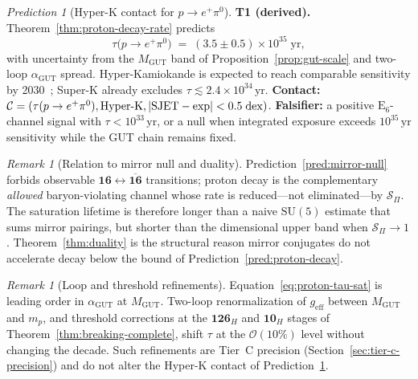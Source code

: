\documentclass[11pt]{article}
\theoremstyle{plain}
\theoremstyle{definition}
\theoremstyle{remark}
\newtheorem{remark}[theorem]{Remark}
\newtheorem{prediction}[theorem]{Prediction}
\numberwithin{equation}{section}
\newcommand{\E}[1]{\mathrm{E}_{#1}}
\begin{document}
\begin{prediction}[Hyper-K contact for $p\to e^+\pi^0$]\label{pred:hyperk}
\textbf{T1 (derived).} Theorem~\ref{thm:proton-decay-rate} predicts
\begin{equation}\label{eq:hyperk-target}
  \tau\!\bigl(p\to e^+\pi^0\bigr)
  \;=\;
  (3.5\pm 0.5)\times 10^{35}\;\mathrm{yr},
\end{equation}
with uncertainty from the $M_{\mathrm{GUT}}$ band of
Proposition~\ref{prop:gut-scale} and two-loop $\alpha_{\mathrm{GUT}}$ spread.
Hyper-Kamiokande is expected to reach comparable sensitivity by
2030~\cite{SuperK2020}; Super-K already excludes $\tau\lesssim 2.4\times
10^{34}\,\mathrm{yr}$. \textbf{Contact:}
$\mathcal{C}=(\tau(p\to e^+\pi^0),\mathrm{Hyper\text{-}K},
|{\rm SJET}-{\rm exp}|<0.5\;\mathrm{dex})$.
\textbf{Falsifier:} a positive $\E{6}$-channel signal with
$\tau<10^{33}\,\mathrm{yr}$, or a null when integrated exposure exceeds
$10^{35}\,\mathrm{yr}$ sensitivity while the GUT chain remains fixed.
\end{prediction}

\begin{remark}[Relation to mirror null and duality]
Prediction~\ref{pred:mirror-null} forbids observable
$\mathbf{16}\leftrightarrow\overline{\mathbf{16}}$ transitions; proton decay is
the complementary \emph{allowed} baryon-violating channel whose rate is
reduced—not eliminated—by $\mathcal{S}_\Pi$. The saturation lifetime is
therefore longer than a naive $\mathrm{SU}(5)$ estimate that sums mirror
pairings, but shorter than the dimensional upper band when
$\mathcal{S}_\Pi\to 1$. Theorem~\ref{thm:duality} is the structural reason
mirror conjugates do not accelerate decay below the bound of
Prediction~\ref{pred:proton-decay}.
\end{remark}

\begin{remark}[Loop and threshold refinements]
Equation~\eqref{eq:proton-tau-sat} is leading order in $\alpha_{\mathrm{GUT}}$
at $M_{\mathrm{GUT}}$. Two-loop renormalization of $g_{\mathrm{eff}}$ between
$M_{\mathrm{GUT}}$ and $m_p$, and threshold corrections at the
$\mathbf{126}_H$ and $\mathbf{10}_H$ stages of
Theorem~\ref{thm:breaking-complete}, shift $\tau$ at the $\mathcal{O}(10\%)$
level without changing the decade. Such refinements are Tier~C precision
(Section~\ref{sec:tier-c-precision}) and do not alter the Hyper-K contact of
Prediction~\ref{pred:hyperk}.
\end{remark}%
\end{document}
